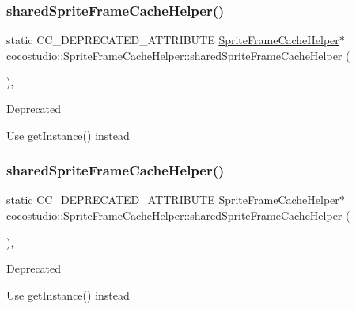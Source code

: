 \subsubsection{\texorpdfstring{shared\+Sprite\+Frame\+Cache\+Helper()}{sharedSpriteFrameCacheHelper()}\hspace{0.1cm}{\footnotesize\ttfamily [1/2]}}
{\footnotesize\ttfamily static C\+C\+\_\+\+D\+E\+P\+R\+E\+C\+A\+T\+E\+D\+\_\+\+A\+T\+T\+R\+I\+B\+U\+TE \hyperlink{classcocostudio_1_1SpriteFrameCacheHelper}{Sprite\+Frame\+Cache\+Helper}$\ast$ cocostudio\+::\+Sprite\+Frame\+Cache\+Helper\+::shared\+Sprite\+Frame\+Cache\+Helper (\begin{DoxyParamCaption}{ }\end{DoxyParamCaption})\hspace{0.3cm}{\ttfamily [inline]}, {\ttfamily [static]}}

\begin{DoxyRefDesc}{Deprecated}
\item[\hyperlink{deprecated__deprecated000081}{Deprecated}]Use get\+Instance() instead \end{DoxyRefDesc}
\mbox{\label{classcocostudio_1_1SpriteFrameCacheHelper_ab95d3824bcdb2434d7b238b0b032280c}} 
\subsubsection{\texorpdfstring{shared\+Sprite\+Frame\+Cache\+Helper()}{sharedSpriteFrameCacheHelper()}\hspace{0.1cm}{\footnotesize\ttfamily [2/2]}}
{\footnotesize\ttfamily static C\+C\+\_\+\+D\+E\+P\+R\+E\+C\+A\+T\+E\+D\+\_\+\+A\+T\+T\+R\+I\+B\+U\+TE \hyperlink{classcocostudio_1_1SpriteFrameCacheHelper}{Sprite\+Frame\+Cache\+Helper}$\ast$ cocostudio\+::\+Sprite\+Frame\+Cache\+Helper\+::shared\+Sprite\+Frame\+Cache\+Helper (\begin{DoxyParamCaption}{ }\end{DoxyParamCaption})\hspace{0.3cm}{\ttfamily [inline]}, {\ttfamily [static]}}

\begin{DoxyRefDesc}{Deprecated}
\item[\hyperlink{deprecated__deprecated000316}{Deprecated}]Use get\+Instance() instead \end{DoxyRefDesc}


